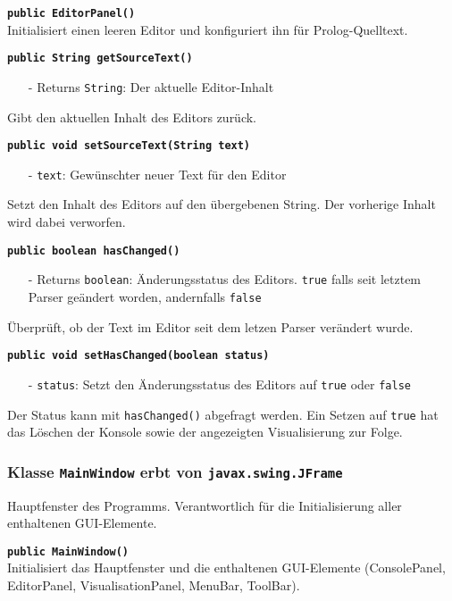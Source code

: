 \documentclass[parskip=full,11pt,twoside]{scrartcl}
\begin{document}
\textbf{\texttt{public EditorPanel()}}\\
Initialisiert einen leeren Editor und konfiguriert ihn für Prolog-Quelltext.

\textbf{\texttt{public String getSourceText()}}
\begin{itemize}[noitemsep]
	\item[-] Returns \texttt{String}: Der aktuelle Editor-Inhalt
\end{itemize}
Gibt den aktuellen Inhalt des Editors zurück.

\textbf{\texttt{public void setSourceText(String text)}}
\begin{itemize}[noitemsep]
	\item[-] \texttt{text}: Gewünschter neuer Text für den Editor
\end{itemize}
Setzt den Inhalt des Editors auf den übergebenen String. Der vorherige Inhalt wird dabei verworfen.

\textbf{\texttt{public boolean hasChanged()}}
\begin{itemize}[noitemsep]
	\item[-] Returns \texttt{boolean}: Änderungsstatus des Editors. \texttt{true} falls seit letztem Parser geändert worden, andernfalls \texttt{false}
\end{itemize}
Überprüft, ob der Text im Editor seit dem letzen Parser verändert wurde.

\textbf{\texttt{public void setHasChanged(boolean status)}}
\begin{itemize}[noitemsep]
	\item[-] \texttt{status}: Setzt den Änderungsstatus des Editors auf \texttt{true} oder \texttt{false}
\end{itemize}
Der Status kann mit \texttt{hasChanged()} abgefragt werden. Ein Setzen auf \texttt{true} hat das Löschen der Konsole sowie der angezeigten Visualisierung zur Folge.

\subsubsection{Klasse \texttt{MainWindow} erbt von \texttt{javax.swing.JFrame}}

Hauptfenster des Programms. Verantwortlich für die Initialisierung aller enthaltenen GUI-Elemente.

\textbf{\texttt{public MainWindow()}}\\
Initialisiert das Hauptfenster und die enthaltenen GUI-Elemente (ConsolePanel, EditorPanel, VisualisationPanel, MenuBar, ToolBar).
\end{document}

